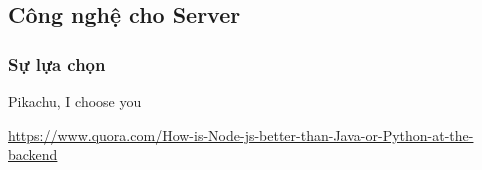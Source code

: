 \subsection{Công nghệ cho Server}



\subsubsection{Sự lựa chọn}
Pikachu, I choose you


\url{https://www.quora.com/How-is-Node-js-better-than-Java-or-Python-at-the-backend}